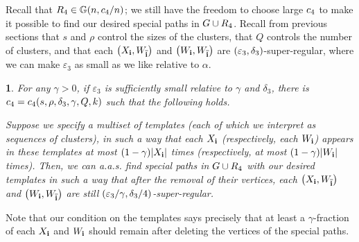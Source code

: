 \documentclass[11pt,english]{article}
\theoremstyle{plain}
\theoremstyle{plain}
\theoremstyle{plain}
\theoremstyle{plain}
\theoremstyle{plain}
\theoremstyle{definition}
\theoremstyle{definition}
\theoremstyle{remark}
\theoremstyle{remark}
\newtheorem{claim}[thm]{\protect\claimname}
\theoremstyle{plain}
\theoremstyle{definition}
\theoremstyle{definition}
\theoremstyle{plain}
\theoremstyle{plain}
\theoremstyle{plain}
\theoremstyle{plain}
\theoremstyle{remark}
\theoremstyle{plain}
\newtheorem{myclaim}[mythm]{\protect\claimname}
\renewenvironment{claim}{\begin{myclaim}}{\end{myclaim}}
\theoremstyle{definition}
\let\originalleft\left
\let\originalright\right
\renewcommand{\left}{\mathopen{}\mathclose\bgroup\originalleft}
\renewcommand{\right}{\aftergroup\egroup\originalright}
\providecommand{\claimname}{Claim}
\begin{document}
Recall that $\R_{4}\in\GG\left(n,\c_{4}/n\right)$; we still have
the freedom to choose large $c_{4}$ to make it possible to find
our desired special paths in $G\cup R_{4}$. Recall from previous
sections that $s$ and $\rho$ control the sizes of the clusters,
that $Q$ controls the number of clusters, and that each $\left(X_{\bi},W_{\flip{\bi}}\right)$
and $\left(W_{\bi},W_{\flip{\bi}}\right)$ are $\left(\varepsilon_{3},\delta_{3}\right)$-super-regular,
where we can make $\varepsilon_{3}$ as small as we like relative
to $\alpha$.
\begin{claim}
\label{lem:adjusting-paths}For any $\gamma>0$, if $\varepsilon_{3}$
is sufficiently small relative to $\gamma$ and $\delta_{3}$, there
is $\c_{4}=\c_{4}\left(s,\rho,\delta_{3},\gamma,Q,k\right)$ such
that the following holds.

Suppose we specify a multiset of templates (each of which we interpret
as sequences of clusters), in such a way that each $X_{\mathbf{i}}$ (respectively,
each $W_{\mathbf{i}}$) appears in these templates at most $\left(1-\gamma\right)\left|X_{\bi}\right|$
times (respectively, at most $\left(1-\gamma\right)\left|W_{\bi}\right|$
times). Then, we can a.a.s. find special paths in $G\cup R_{4}$
with our desired templates in such a way that after the removal of
their vertices, each $\left(X_{\bi},W_{\flip{\bi}}\right)$ and $\left(W_{\bi},W_{\flip{\bi}}\right)$
are still $\left(\varepsilon_{3}/\gamma,\delta_{3}/4\right)$-super-regular.
\end{claim}
Note that our condition on the templates says precisely that at least
a $\gamma$-fraction of each $X_{\mathbf{i}}$ and $W_{\mathbf{i}}$ should remain
after deleting the vertices of the special paths.
\end{document}
